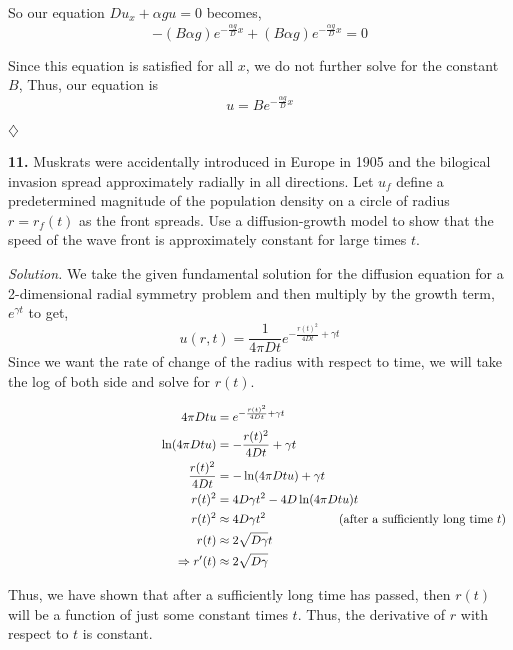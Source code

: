 \documentclass{article}
\begin{document}
\noindent
So our equation \(Du_{x}+ \alpha gu = 0 \) becomes,
\[
 -(B\alpha g) e^{ {-\frac{\alpha g}{D}x} }  + (B\alpha g)e^{ {-\frac{\alpha g}{D}x} } =0
\] 

\noindent
Since this equation is satisfied for all \(x\), we do not further solve for the constant \(B\),
Thus, our equation is 
\[ 
u= Be^ {-\frac{\alpha g}{D}x}
\] 
\begin{flushright}
\( \diamondsuit \) 
\end{flushright}



\newpage
\noindent
\textbf{11.} Muskrats were accidentally introduced in Europe in 1905 and the bilogical invasion spread approximately radially in all directions. Let \(u_f\) define a predetermined magnitude of the population density on a circle of radius \(r=r_f(t)\) as the front spreads. Use a diffusion-growth model to show that the speed of the wave front is approximately constant for large times \(t\).

\vspace{2mm}
\noindent
\textit{Solution.} We take the given fundamental solution for the diffusion equation for a 2-dimensional radial symmetry problem and then multiply by the growth term, \( e^{\gamma t}\) to get, 
\[
 u(r,t) = \frac{1}{4\pi Dt}e^{-\frac{r(t)^2}{4Dt} + \gamma t}
\]
\noindent
Since we want the rate of change of the radius with respect to time, we will take the log of both side and solve for \(r(t)\). 

\begin{align*}
\hspace{50mm}  4\pi Dt u &= e^{-\frac{r(t)^2}{4Dt} + \gamma t} \\
\ln(4\pi Dt u) &= -\frac{r(t)^2}{4Dt} + \gamma t \\
 \frac{r(t)^2}{4Dt} &= -\ln(4\pi Dt u) + \gamma t \\
 r(t)^2 &= 4D\gamma t^2 - 4D\ln(4\pi Dt u)t   \\
 r(t)^2 & \approx 4D\gamma t^2      \hspace{20mm}  \text{         (after a sufficiently long time \(t\)) }\\
 r(t)&\approx 2\sqrt{D\gamma}t \\
 \Rightarrow r'(t) &\approx 2\sqrt{D\gamma}
\end{align*}

\noindent
Thus, we have shown that after a sufficiently long time has passed, then \(r(t)\) will be a function of just some constant times \(t\). Thus, the derivative of \(r\) with respect to \(t\) is constant. 
\end{document}
